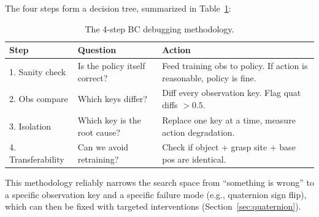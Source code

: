 The four steps form a decision tree, summarized in Table~\ref{tab:methodology}:

\begin{table}[h]
\centering
\caption{The 4-step BC debugging methodology.}
\label{tab:methodology}
\small
\begin{tabular}{p{} p{} p{}}
\toprule
\textbf{Step} & \textbf{Question} & \textbf{Action} \\
\midrule
1. Sanity check & Is the policy itself correct? & Feed training obs to policy. If action is reasonable, policy is fine. \\
2. Obs compare & Which keys differ? & Diff every observation key. Flag quat diffs $>0.5$. \\
3. Isolation & Which key is the root cause? & Replace one key at a time, measure action degradation. \\
4. Transferability & Can we avoid retraining? & Check if object + grasp site + base pos are identical. \\
\bottomrule
\end{tabular}
\end{table}

This methodology reliably narrows the search space from ``something is wrong'' to a specific observation key and a specific failure mode (e.g., quaternion sign flip), which can then be fixed with targeted interventions (Section~\ref{sec:quaternion}).

